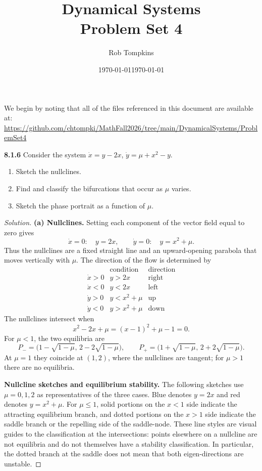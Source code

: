 \documentclass[10pt]{amsart}
\title{Dynamical Systems\\Problem Set 4}
\author{Rob Tompkins}
\date{\today}
\newenvironment{solution}
{\begin{proof}[Solution]}
{\end{proof}}
\begin{document}
    \maketitle
    \date{\today}
    \begin{onehalfspace}
        We begin by noting that all of the files referenced in this document are available at: \\
        \underline{https://github.com/chtompki/MathFall2026/tree/main/DynamicalSystems/ProblemSet4}

        \noindent\textbf{8.1.6}
        Consider the system $\dot{x}=y-2x$, $\dot{y}=\mu+x^2-y$.
        \begin{enumerate}[label=\alph*)]
            \item Sketch the nullclines.
            \item Find and classify the bifurcations that occur as $\mu$ varies.
            \item Sketch the phase portrait as a function of $\mu$.
        \end{enumerate}

        \begin{solution}
\textbf{(a) Nullclines.} Setting each component of the vector field equal to zero gives
\[
    \dot{x}=0:\quad y=2x,
    \qquad
    \dot{y}=0:\quad y=x^2+\mu.
\]
Thus the nullclines are a fixed straight line and an upward-opening parabola that moves vertically with $\mu$. The direction of the flow is determined by
\[
\begin{array}{c|cc}
 & \text{condition} & \text{direction}\\ \hline
\dot{x}>0 & y>2x & \text{right}\\
\dot{x}<0 & y<2x & \text{left}\\
\dot{y}>0 & y<x^2+\mu & \text{up}\\
\dot{y}<0 & y>x^2+\mu & \text{down}
\end{array}
\]
The nullclines intersect when
\[
    x^2-2x+\mu=(x-1)^2+\mu-1=0.
\]
For $\mu<1$, the two equilibria are
\[
    P_-=\bigl(1-\sqrt{1-\mu},\,2-2\sqrt{1-\mu}\bigr),\qquad P_+=\bigl(1+\sqrt{1-\mu},\,2+2\sqrt{1-\mu}\bigr).
\]
At $\mu=1$ they coincide at $(1,2)$, where the nullclines are tangent; for $\mu>1$ there are no equilibria.

\medskip
\noindent\textbf{Nullcline sketches and equilibrium stability.}
The following sketches use $\mu=0,1,2$ as representatives of the three cases. Blue denotes $y=2x$ and red denotes $y=x^2+\mu$. For $\mu\leq1$, solid portions on the $x<1$ side indicate the attracting equilibrium branch, and dotted portions on the $x>1$ side indicate the saddle branch or the repelling side of the saddle-node. These line styles are visual guides to the classification at the intersections: points elsewhere on a nullcline are not equilibria and do not themselves have a stability classification. In particular, the dotted branch at the saddle does not mean that both eigen-directions are unstable.


\end{solution}
\end{onehalfspace}
\end{document}
